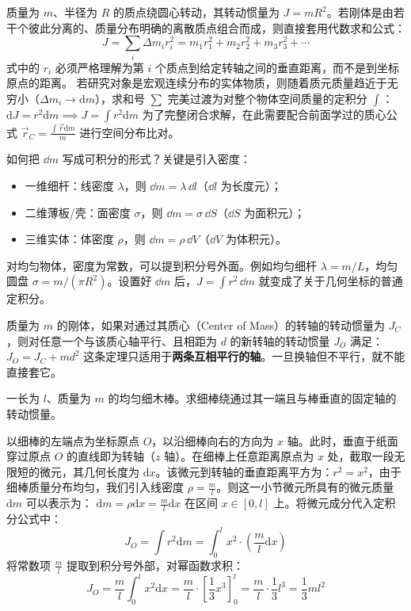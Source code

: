 \documentclass[lang=cn,11pt]{elegantbook}
\begin{document}
\begin{definition}
质量为 \(m\)、半径为 \(R\) 的质点绕圆心转动，其转动惯量为 \(J=mR^2\)。若刚体是由若干个彼此分离的、质量分布明确的离散质点组合而成，则直接套用代数求和公式：$$J = \sum_i \Delta m_i r_i^2 = m_1 r_1^2 + m_2 r_2^2 + m_3 r_3^2 + \cdots$$式中的 $r_i$ 必须严格理解为第 $i$ 个质点到给定转轴之间的垂直距离，而不是到坐标原点的距离。
若研究对象是宏观连续分布的实体物质，则随着质元质量趋近于无穷小（$\Delta m_i \to \mathrm{d}m$），求和号 $\sum$ 完美过渡为对整个物体空间质量的定积分 $\int$： \(\mathrm{d}J = r^2 \mathrm{d}m \implies \boxed{J = \int r^2 \mathrm{d}m}\) 为了完整闭合求解，在此需要配合前面学过的质心公式 $\vec{r}_C = \frac{\int \vec{r} \mathrm{d}m}{m}$ 进行空间分布比对。

如何把 \(\dd m\) 写成可积分的形式？关键是引入密度：
\begin{itemize}
\item 一维细杆：线密度 \(\lambda\)，则 \(\dd m=\lambda\,\dd l\)（\(\dd l\) 为长度元）；
\item 二维薄板/壳：面密度 \(\sigma\)，则 \(\dd m=\sigma\,\dd S\)（\(\dd S\) 为面积元）；
\item 三维实体：体密度 \(\rho\)，则 \(\dd m=\rho\,\dd V\)（\(\dd V\) 为体积元）。
\end{itemize}
对均匀物体，密度为常数，可以提到积分号外面。例如均匀细杆 \(\lambda=m/L\)，均匀圆盘 \(\sigma=m/(\pi R^2)\)。设置好 \(\dd m\) 后，\(J=\int r^2\,\dd m\) 就变成了关于几何坐标的普通定积分。
\end{definition}

\begin{theorem}[平行轴定理]
质量为 $m$ 的刚体，如果对通过其质心（Center of Mass）的转轴的转动惯量为 $J_C$，则对任意一个与该质心轴平行、且相距为 $d$ 的新转轴的转动惯量 $J_O$ 满足： \(\boxed{J_O = J_C + md^2}\) 这条定理只适用于\textbf{两条互相平行的轴}。一旦换轴但不平行，就不能直接套它。
\end{theorem}

\begin{exercise}
一长为 $l$、质量为 $m$ 的均匀细木棒。求细棒绕通过其一端且与棒垂直的固定轴的转动惯量。
\end{exercise}
\begin{solution}
以细棒的左端点为坐标原点 $O$，以沿细棒向右的方向为 $x$ 轴。此时，垂直于纸面穿过原点 $O$ 的直线即为转轴（$z$ 轴）。在细棒上任意距离原点为 $x$ 处，截取一段无限短的微元，其几何长度为 $\mathrm{d}x$。该微元到转轴的垂直距离平方为：$r^2 = x^2$，由于细棒质量分布均匀，我们引入线密度 $\rho = \frac{m}{l}$。则这一小节微元所具有的微元质量 $\mathrm{d}m$ 可以表示为： \(\mathrm{d}m = \rho \mathrm{d}x = \frac{m}{l}\mathrm{d}x\) 
在区间 $x \in [0, l]$ 上。将微元成分代入定积分公式中：$$J_O = \int r^2 \mathrm{d}m = \int_{0}^{l} x^2 \cdot \left(\frac{m}{l}\mathrm{d}x\right)$$将常数项 $\frac{m}{l}$ 提取到积分号外部，对幂函数求积：$$J_O = \frac{m}{l} \int_{0}^{l} x^2 \mathrm{d}x = \frac{m}{l} \cdot \left[ \frac{1}{3}x^3 \right]_0^l = \frac{m}{l} \cdot \frac{1}{3}l^3 = \frac{1}{3}ml^2$$
\end{solution}
\end{document}
